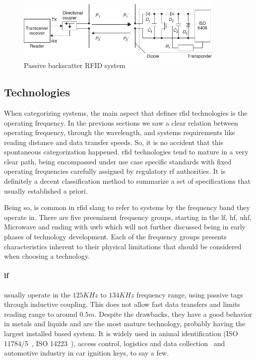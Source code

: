\begin{figure}[!ht]
    \centering
    \includegraphics[width=0.9\textwidth]{./figs/02-state-of-the-art/backscatter.pdf}
    \caption{Passive backscatter RFID system~\cite{finkenzellerRFIDHandbookFundamentals2003}} 
    \label{fig:backscatter}
\end{figure}

\subsection{Technologies} \label{sec:opfrequency}

When categorizing systems, the main aspect that defines \ac{rfid} technologies is the operating frequency.
In the previous sections we saw a clear relation between operating frequency, through the wavelength, and systems requirements like reading distance and data transfer speeds.
So, it is no accident that this spontaneous categorization happened. \ac{rfid} technologies tend to mature in a very clear path, being encompassed under use case specific standards with fixed operating frequencies carefully assigned by regulatory \ac{rf} authorities. 
It is definitely a decent classification method to summarize a set of specifications that usually established a priori.

Being so, is common in \ac{rfid} slang to refer to systems by the frequency band they operate in.
There are five preeminent frequency groups, starting in the \ac{lf}, \ac{hf}, \ac{uhf}, Microwave and ending with \ac{uwb} which will not further discussed being in early phases of technology development.
Each of the frequency groups presents characteristics inherent to their physical limitations that should be considered when choosing a technology.

\paragraph*{\ac{lf}} usually operate in the $125KHz$ to $134KHz$ frequency range, using passive tags through inductive coupling. This does not allow fast data transfers and limits reading range to around $0.5m$. Despite the drawbacks, they have a good behavior in metals and liquids and are the most mature technology, probably having the largest installed based system.
It is widely used in animal identification (ISO 11784/5~\cite{isoISO117841996, isoISO117851996}, ISO 14223~\cite{isoISO1422332018}), access control, logistics and data collection~\cite{isoISOIEC180002} and automotive industry in car ignition keys, to say a few.


